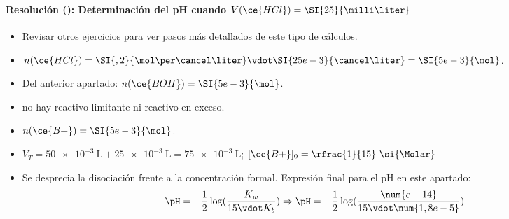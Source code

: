 \begin{frame}
	\frametitle{\ejerciciocmd}
	\framesubtitle{Resolución (): Determinación del pH cuando $V(\ce{HCl})=\SI{25}{\milli\liter}$}
	\begin{itemize}
		\item{} Revisar otros ejercicios para ver pasos más detallados de este tipo de cálculos.
		\item{} $n(\ce{HCl}) = \SI{,2}{\mol\per\cancel\liter}\vdot\SI{25e-3}{\cancel\liter}=\SI{5e-3}{\mol}$.
		\item\alert{Del anterior apartado:} $n(\ce{BOH})=\SI{5e-3}{\mol}$.
		\item{} no hay reactivo limitante ni reactivo en exceso.
		\item{} $n(\ce{B+})=\SI{5e-3}{\mol}$.
		\item{} $V_T = \SI{50e-3}{\liter} + \SI{25e-3}{\liter} = \SI{75e-3}{\liter}$; $[\ce{B+}]_0 = \rfrac{1}{15}~\si{\Molar}$
		\item Se desprecia la disociación frente a la concentración formal. Expresión final para el pH en este apartado:
		$$
			\pH = -\frac{1}{2}\log(\frac{K_w}{15\vdot K_b})\Rightarrow\pH = -\frac{1}{2}\log(\frac{\num{e-14}}{15\vdot\num{1,8e-5}})
		$$
		\begin{center}
		\end{center}
	\end{itemize}
\end{frame}
